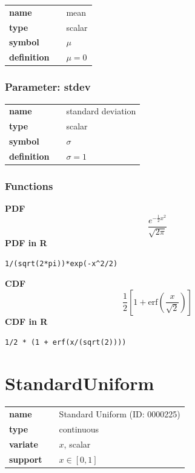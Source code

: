 \documentclass{article}
\begin{document}
\noindent\begin{tabular}{p{2cm}cl}
\textbf{name} & & mean \\
\textbf{type} & & scalar \\
\textbf{symbol} & & $\mu$  \\
\textbf{definition} & & $\mu=0$
\end{tabular}
\subsubsection*{Parameter: stdev}

\noindent\begin{tabular}{p{2cm}cl}
\textbf{name} & & standard deviation \\
\textbf{type} & & scalar \\
\textbf{symbol} & & $\sigma$  \\
\textbf{definition} & & $\sigma=1$
\end{tabular}
\subsubsection*{Functions}

\smallskip \noindent \hspace{.2cm} \textbf{PDF} 
\begin{equation*}\frac{e^{-\frac{1}{2} x^2}}{\sqrt{2\pi}}\end{equation*}
\smallskip \noindent \hspace{.2cm} \textbf{PDF in R}  
\begin{verbatim}1/(sqrt(2*pi))*exp(-x^2/2)\end{verbatim}
\smallskip \noindent \hspace{.2cm} \textbf{CDF} 
\begin{equation*}\frac12\left[1 + \text{erf}\left( \frac{x}{\sqrt{2}}\right)\right]\end{equation*}
\smallskip \noindent \hspace{.2cm} \textbf{CDF in R} 
\begin{verbatim}1/2 * (1 + erf(x/(sqrt(2))))\end{verbatim}
\smallskip\section*{StandardUniform} 

  \bigskip 

\begin{tabular}{p{2cm}cl}
\textbf{name} & & Standard Uniform (ID: 0000225)\\ 
 
\textbf{type} & & continuous \\ 

\textbf{variate} & & $x$, scalar \\ 

\textbf{support} & & $x \in [0,1]$
\end{tabular}
\end{document}
